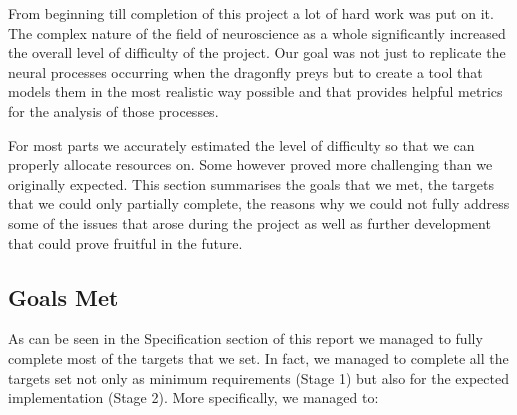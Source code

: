 \documentclass[a4paper,11pt]{article}
\begin{document}
From beginning till completion of this project a lot of hard work was put on it. The complex nature of 
the field of neuroscience as a whole significantly increased the overall level of difficulty of the 
project. Our goal was not just to replicate the neural processes occurring when the dragonfly preys 
but to create a tool that models them in the most realistic way possible and that provides helpful 
metrics for the analysis of those processes.

For most parts we accurately estimated the level of difficulty so that we can properly allocate 
resources on. Some however proved more challenging than we originally expected. This section 
summarises the goals that we met, the targets that we could only partially complete, the reasons
why we could not fully address some of the issues that arose during the project as well as further
development that could prove fruitful in the future.

\subsection{Goals Met}

As can be seen in the Specification section of this report we managed to fully complete most of the 
targets that we set. In fact, we managed to complete all the targets set not only as minimum 
requirements (Stage 1) but also for the expected implementation (Stage 2). More specifically, we 
managed to:
\end{document}
